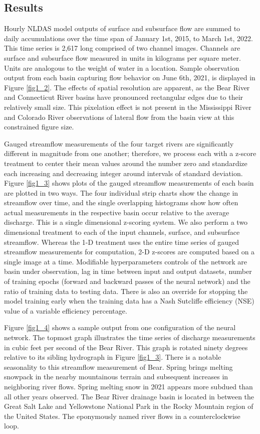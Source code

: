 \begin{refsection}
\subsection{Results}
Hourly NLDAS model outputs of surface and subsurface flow are summed to daily accumulations over the time span of January 1st, 2015, to March 1st, 2022. This time series is 2,617 long comprised of two channel images. Channels are surface and subsurface flow measured in units in kilograms per square meter. Units are analogous to the weight of water in a location. Sample observation output from each basin capturing flow behavior on June 6th, 2021, is displayed in Figure \ref{fig1_2}. The effects of spatial resolution are apparent, as the Bear River and Connecticut River basins have pronounced rectangular edges due to their relatively small size. This pixelation effect is not present in the Mississippi River and Colorado River observations of lateral flow from the basin view at this constrained figure size.

Gauged streamflow measurements of the four target rivers are significantly different in magnitude from one another; therefore, we process each with a z-score treatment to center their mean values around the number zero and standardize each increasing and decreasing integer around intervals of standard deviation. Figure \ref{fig1_3} shows plots of the gauged streamflow measurements of each basin are plotted in two ways. The four individual strip charts show the change in streamflow over time, and the single overlapping histograms show how often actual measurements in the respective basin occur relative to the average discharge. This is a single dimensional z-scoring system. We also perform a two dimensional treatment to each of the input channels, surface, and subsurface streamflow. Whereas the 1-D treatment uses the entire time series of gauged streamflow measurements for computation, 2-D z-scores are computed based on a single image at a time. Modifiable hyperparameters controls of the network are basin under observation, lag in time between input and output datasets, number of training epochs (forward and backward passes of the neural network) and the ratio of training data to testing data. There is also an override for stopping the model training early when the training data has a Nash Sutcliffe efficiency (NSE) value of a variable efficiency percentage.

Figure \ref{fig1_4} shows a sample output from one configuration of the neural network. The topmost graph illustrates the time series of discharge measurements in cubic feet per second of the Bear River. This graph is rotated ninety degrees relative to its sibling hydrograph in Figure \ref{fig1_3}. There is a notable seasonality to this streamflow measurement of Bear. Spring brings melting snowpack in the nearby mountainous terrain and subsequent increases in neighboring river flows. Spring melting snow in 2021 appears more subdued than all other years observed. The Bear River drainage basin is located in between the Great Salt Lake and Yellowstone National Park in the Rocky Mountain region of the United States. The eponymously named river flows in a counterclockwise loop.


\end{refsection}
